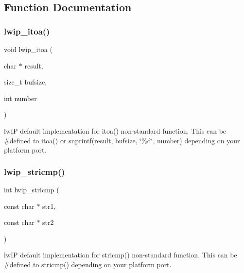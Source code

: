 \subsection{Function Documentation}
\mbox{\label{group__sys__nonstandard_gaf15b4fbaaae5bb7f6da4301f3f979284}} 
\subsubsection{\texorpdfstring{lwip\+\_\+itoa()}{lwip\_itoa()}}
{\footnotesize\ttfamily void lwip\+\_\+itoa (\begin{DoxyParamCaption}\item[{char $\ast$}]{result,  }\item[{size\+\_\+t}]{bufsize,  }\item[{int}]{number }\end{DoxyParamCaption})}

lw\+IP default implementation for itoa() non-\/standard function. This can be \#defined to itoa() or snprintf(result, bufsize, \char`\"{}\%d\char`\"{}, number) depending on your platform port. \mbox{\label{group__sys__nonstandard_ga263cbafcb697eff964139a9998a6668a}} 
\subsubsection{\texorpdfstring{lwip\+\_\+stricmp()}{lwip\_stricmp()}}
{\footnotesize\ttfamily int lwip\+\_\+stricmp (\begin{DoxyParamCaption}\item[{const char $\ast$}]{str1,  }\item[{const char $\ast$}]{str2 }\end{DoxyParamCaption})}

lw\+IP default implementation for stricmp() non-\/standard function. This can be \#defined to stricmp() depending on your platform port. \mbox{\label{group__sys__nonstandard_ga997dcc49451121d4ed755b33bc7bd26a}} 
